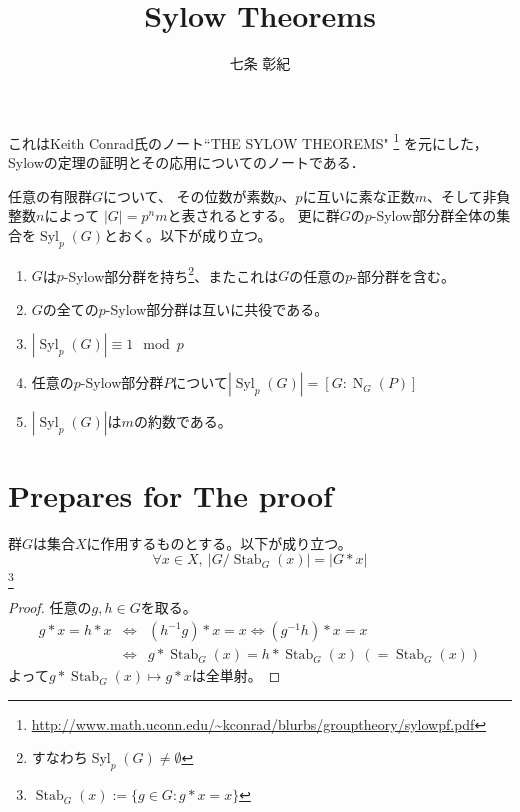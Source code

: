 \documentclass[a4paper]{jsarticle}
\title{Sylow Theorems}
\author{七条 彰紀}
\newcommand{\Stab}{\operatorname{Stab}}
\newcommand{\Norm}{\operatorname{N}}
\newcommand{\Syl}{\operatorname{Syl}}
\begin{document}
\maketitle
これはKeith Conrad氏のノート``THE SYLOW THEOREMS"
\footnote{\url{http://www.math.uconn.edu/~kconrad/blurbs/grouptheory/sylowpf.pdf}}
を元にした，Sylowの定理の証明とその応用についてのノートである．

\begin{Them}
    任意の有限群$G$について、
    その位数が素数$p$、$p$に互いに素な正数$m$、そして非負整数$n$によって
    $|G|=p^{n}m$と表されるとする。
    更に群$G$の$p$-Sylow部分群全体の集合を$\Syl_p(G)$とおく。以下が成り立つ。
    \begin{enumerate}
        \renewcommand{\labelenumi}{\Roman{enumi}.}
        \item $G$は$p$-Sylow部分群を持ち\footnote{すなわち$\Syl_p(G) \neq \emptyset$}、またこれは$G$の任意の$p$-部分群を含む。
        \item $G$の全ての$p$-Sylow部分群は互いに共役である。
        \item $|\Syl_p(G)| \equiv 1 \mod p$
        \item 任意の$p$-Sylow部分群$P$について$|\Syl_p(G)| = [G:\Norm_G(P)]$
        \item $|\Syl_p(G)|$は$m$の約数である。
    \end{enumerate}
\end{Them}

\section{Prepares for The proof}
    \begin{Them}
        群$G$は集合$X$に作用するものとする。以下が成り立つ。
        \[ \forall x \in  X,~ |G / \Stab_G(x)|=|G \ast x| \]
        \footnote{$\Stab_G(x):=\{g \in G : g \ast x=x \}$}
    \end{Them}
    \begin{proof}
        任意の$g, h \in G$を取る。
        \begin{eqnarray*}
            g \ast x=h \ast x
                &\iff& (h^{-1}g) \ast x=x \iff (g^{-1}h) \ast x=x \\
                &\iff& g \ast \Stab_G(x)= h \ast \Stab_G(x) ~(=\Stab_G(x))
        \end{eqnarray*}
        よって$g \ast \Stab_G(x) \mapsto g \ast x$は全単射。
    \end{proof}
\end{document}
